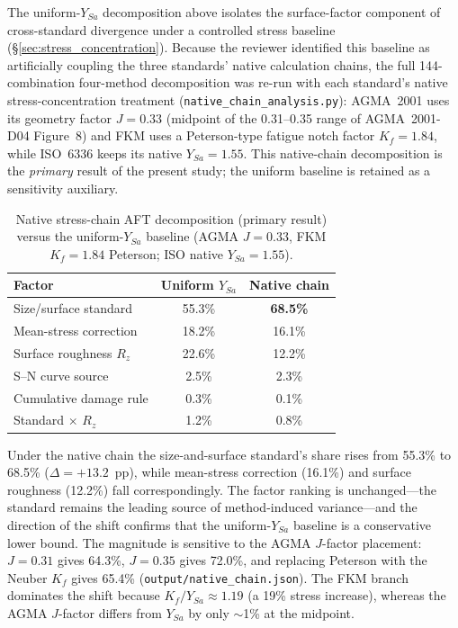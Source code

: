 \documentclass[twocolumn,12pt,a4paper]{article}
\begin{document}
The uniform-$Y_{Sa}$ decomposition above isolates the surface-factor
component of cross-standard divergence under a controlled stress
baseline (\S\ref{sec:stress_concentration}). Because the reviewer
identified this baseline as artificially coupling the three standards'
native calculation chains, the full 144-combination four-method
decomposition was re-run with each standard's native stress-concentration
treatment (\texttt{native\_chain\_analysis.py}): AGMA~2001 uses its
geometry factor $J=0.33$ (midpoint of the 0.31--0.35 range of
AGMA~2001-D04 Figure~8) and FKM uses a Peterson-type fatigue notch
factor $K_f=1.84$, while ISO~6336 keeps its native $Y_{Sa}=1.55$.
This native-chain decomposition is the \emph{primary} result of the
present study; the uniform baseline is retained as a sensitivity
auxiliary.

\begin{table}[h]
\centering
\caption{Native stress-chain AFT decomposition (primary result) versus
the uniform-$Y_{Sa}$ baseline (AGMA $J=0.33$, FKM $K_f=1.84$
Peterson; ISO native $Y_{Sa}=1.55$).\label{tab:native_chain}}
\footnotesize
\begin{tabular}{@{}lcc@{}}
\toprule
Factor & Uniform $Y_{Sa}$ & Native chain \\
\midrule
Size/surface standard & 55.3\% & \textbf{68.5\%} \\
Mean-stress correction & 18.2\% & 16.1\% \\
Surface roughness $R_z$ & 22.6\% & 12.2\% \\
S--N curve source & 2.5\% & 2.3\% \\
Cumulative damage rule & 0.3\% & 0.1\% \\
Standard $\times$ $R_z$ & 1.2\% & 0.8\% \\
\bottomrule
\end{tabular}
\end{table}

Under the native chain the size-and-surface standard's share rises
from 55.3\% to 68.5\% ($\Delta = +13.2$~pp), while mean-stress
correction (16.1\%) and surface roughness (12.2\%) fall
correspondingly. The factor ranking is unchanged---the standard
remains the leading source of method-induced variance---and the
direction of the shift confirms that the uniform-$Y_{Sa}$ baseline is
a conservative lower bound. The magnitude is sensitive to the AGMA
$J$-factor placement: $J=0.31$ gives 64.3\%, $J=0.35$ gives 72.0\%,
and replacing Peterson with the Neuber $K_f$ gives 65.4\%
(\texttt{output/native\_chain.json}). The FKM branch dominates the
shift because $K_f/Y_{Sa}\approx 1.19$ (a 19\% stress increase),
whereas the AGMA $J$-factor differs from $Y_{Sa}$ by only
$\sim$1\% at the midpoint.
\end{document}
